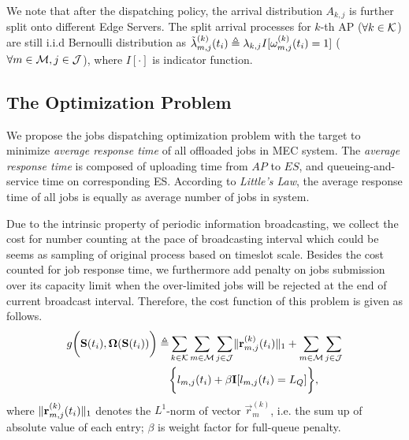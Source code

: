 We note that after the dispatching policy, the arrival distribution $A_{k,j}$ is further split onto different Edge Servers. The split arrival processes for $k$-th AP ($\forall k\in\mathcal{K}$) are still i.i.d Bernoulli distribution as
$\tilde{\lambda}^{(k)}_{m,j}(t_{i}) \triangleq \lambda_{k,j} I[\omega^{(k)}_{m,j}(t_i) = 1]$ ($\forall m\in\mathcal{M}, j\in\mathcal{J}$), where $I[\cdot]$ is indicator function.


\subsection{The Optimization Problem}
We propose the jobs dispatching optimization problem with the target to minimize \emph{average response time} of all offloaded jobs in MEC system.
The \emph{average response time} is composed of uploading time from $AP$ to $ES$, and queueing-and-service time on corresponding ES. According to \emph{Little's Law}, the average response time of all jobs is equally as average number of jobs in system.
        
Due to the intrinsic property of periodic information broadcasting, we collect the cost for number counting at the pace of broadcasting interval which could be seems as sampling of original process based on timeslot scale.
Besides the cost counted for job response time, we furthermore add penalty on jobs submission over its capacity limit when the over-limited jobs will be rejected at the end of current broadcast interval.
Therefore, the cost function of this problem is given as follows.
\begin{align}
    g\bigg(\mathbf{S}(t_{i}), \boldsymbol{\Omega}(\mathbf{S}(t_{i}))\bigg) \triangleq&
    \sum_{k\in\mathcal{K}}\sum_{m\in\mathcal{M}}\sum_{j\in\mathcal{J}} \lVert\mathbf{r}^{(k)}_{m,j}(t_{i})\|_1 + \sum_{m\in\mathcal{M}}\sum_{j\in\mathcal{J}}
    \nonumber\\
    &\bigg\{
        l_{m,j}(t_{i}) + \beta \mathbf{I}[l_{m,j}(t_{i})=L_Q]
    \bigg\},
\end{align}
where $\lVert\mathbf{r}^{(k)}_{m,j}(t_i)\|_1$ denotes the $L^1$-norm of vector $\vec{r}^{(k)}_{m}$, i.e. the sum up of absolute value of each entry; $\beta$ is weight factor for full-queue penalty.
        
